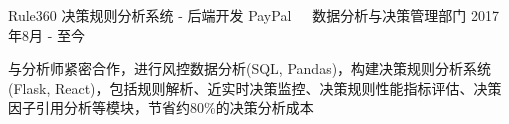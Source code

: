 \documentclass[11pt, a4paper, UTF8]{awesome-cv}
\begin{document}
%
\begin{cventries}
  \cventry
    {Rule360 决策规则分析系统 - 后端开发} %
    {PayPal{\ \cdotp\ \ }数据分析与决策管理部门} %
    {2017年8月 - 至今} %
    {\ } %
    {
      \begin{cvitems} %
        \item {与分析师紧密合作，进行风控数据分析(SQL, Pandas)，构建决策规则分析系统(Flask, React)，包括规则解析、近实时决策监控、决策规则性能指标评估、决策因子引用分析等模块，节省约80\%的决策分析成本}
      \end{cvitems}
    }
    

\end{cventries}
\end{document}
